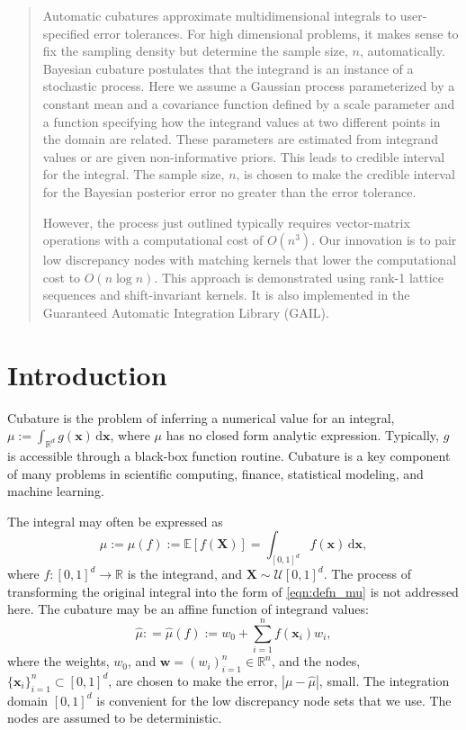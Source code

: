 \documentclass[twocolumn]{svjour3}          %
\newcommand{\bm}[1]{\boldsymbol{#1}}
\newcommand{\dif}[1]{\text{d}{#1}}
\newcommand{\reals}{\mathbb{R}}
\newcommand{\Ex}{\mathbb{E}}
\newcommand{\vw}{\bm{w}}
\newcommand{\vx}{\bm{x}}
\newcommand{\hmu}{\widehat{\mu}}
\def\abs#1{\ensuremath{\left \lvert #1 \right \rvert}}
\begin{document}
\begin{abstract}
Automatic cubatures approximate multidimensional integrals to user-specified error tolerances.  For high dimensional problems, it makes sense to fix the sampling density but determine the 
sample size, $n$, automatically. Bayesian cubature postulates that the integrand is an instance of a stochastic process.  Here we assume a Gaussian process parameterized by a constant mean and a covariance function defined by a scale parameter and a function specifying how the integrand values at two different points in the domain are related.
These parameters are estimated from integrand values or are given non-informative priors.  This leads to credible interval for the integral.  The sample size, $n$, is chosen to make the credible interval for the Bayesian posterior error no greater than the error tolerance. 

However, the process just outlined typically requires vector-matrix operations  with a computational cost of $O(n^3)$. Our innovation is to pair low discrepancy nodes with matching kernels that lower the  computational cost to $O(n \log n)$.   This approach is demonstrated using rank-1 lattice sequences and shift-invariant kernels.  It is also implemented in the Guaranteed Automatic Integration Library (GAIL).


\end{abstract}

\section{Introduction}
\label{intro}
Cubature is the problem of inferring a numerical value for an integral, 
$ \mu := \int_{\reals^d} g(\vx) \, \dif \vx$, where $\mu$ has no closed form analytic expression. Typically, $g$ is accessible through a black-box function routine. 
Cubature is a key component of many problems in scientific computing, finance, statistical modeling, and machine learning.  

The integral may often be expressed as
\begin{equation}
\label{eqn:defn_mu}
\mu:= \mu(f) := \Ex[f(\boldsymbol{X})] = \int_{[0,1]^d} f(\vx)\, \dif\vx, 
\end{equation}
where $f:[0,1]^d \to \reals$ is the integrand, and $\boldsymbol{X} \sim \mathcal{U}[0,1]^d$.  The process of transforming the original integral into the form of \eqref{eqn:defn_mu}  is not addressed here.  The cubature may be an affine function of integrand values:
\begin{equation}
\label{eqn:defn_hmu}  %
\hmu: = \hmu(f) := w_0 + \sum_{i=1}^{n} f(\vx_i) w_i,
\end{equation}
where the weights, $w_0$, and  $\vw = (w_i)_{i=1}^n \in \reals^n$, and the nodes, $\{\vx_i\}_{i=1}^n \subset [0,1]^d$, are chosen to make the error, $\abs{\mu - \hmu}$, small. The integration domain $[0,1]^d$ is convenient for the low discrepancy node sets that we use.  The nodes are assumed to be deterministic.
\end{document}
